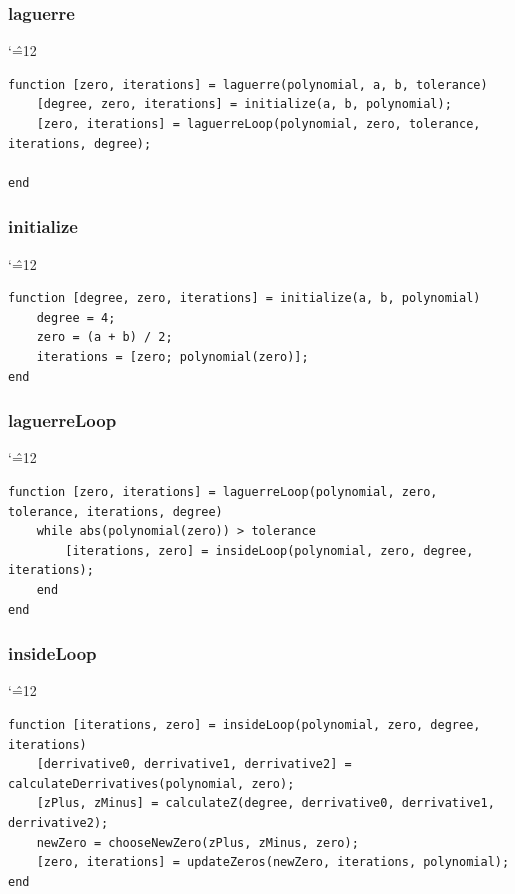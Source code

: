 \documentclass[12pt]{report}
\newenvironment{simplechar}{%
   \catcode`\^=12
}{}
\begin{document}
\subsubsection{laguerre}
\begin{simplechar}
\begin{lstlisting}
function [zero, iterations] = laguerre(polynomial, a, b, tolerance)
    [degree, zero, iterations] = initialize(a, b, polynomial);
    [zero, iterations] = laguerreLoop(polynomial, zero, tolerance, iterations, degree);

end
\end{lstlisting}
\end{simplechar}

\newpage
\subsubsection{initialize}
\begin{simplechar}
\begin{lstlisting}
function [degree, zero, iterations] = initialize(a, b, polynomial)
    degree = 4;
    zero = (a + b) / 2;
    iterations = [zero; polynomial(zero)];
end
\end{lstlisting}
\end{simplechar}

\subsubsection{laguerreLoop}
\begin{simplechar}
\begin{lstlisting}
function [zero, iterations] = laguerreLoop(polynomial, zero, tolerance, iterations, degree)
    while abs(polynomial(zero)) > tolerance
        [iterations, zero] = insideLoop(polynomial, zero, degree, iterations);
    end
end
\end{lstlisting}
\end{simplechar}

\subsubsection{insideLoop}
\begin{simplechar}
\begin{lstlisting}
function [iterations, zero] = insideLoop(polynomial, zero, degree, iterations)
    [derrivative0, derrivative1, derrivative2] = calculateDerrivatives(polynomial, zero);
    [zPlus, zMinus] = calculateZ(degree, derrivative0, derrivative1, derrivative2);
    newZero = chooseNewZero(zPlus, zMinus, zero);
    [zero, iterations] = updateZeros(newZero, iterations, polynomial);
end
\end{lstlisting}
\end{simplechar}
\end{document}
